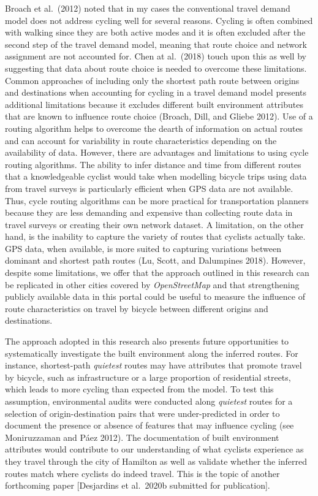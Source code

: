 \documentclass[smallextended]{svjour3}       %
\begin{document}
Broach et al.~(2012) noted that in my cases the conventional travel
demand model does not address cycling well for several reasons. Cycling
is often combined with walking since they are both active modes and it
is often excluded after the second step of the travel demand model,
meaning that route choice and network assignment are not accounted for.
Chen at al.~(2018) touch upon this as well by suggesting that data about
route choice is needed to overcome these limitations. Common approaches
of including only the shortest path route between origins and
destinations when accounting for cycling in a travel demand model
presents additional limitations because it excludes different built
environment attributes that are known to influence route choice (Broach,
Dill, and Gliebe 2012). Use of a routing algorithm helps to overcome the
dearth of information on actual routes and can account for variability
in route characteristics depending on the availability of data. However,
there are advantages and limitations to using cycle routing algorithms.
The ability to infer distance and time from different routes that a
knowledgeable cyclist would take when modelling bicycle trips using data
from travel surveys is particularly efficient when GPS data are not
available. Thus, cycle routing algorithms can be more practical for
transportation planners because they are less demanding and expensive
than collecting route data in travel surveys or creating their own
network dataset. A limitation, on the other hand, is the inability to
capture the variety of routes that cyclists actually take. GPS data,
when available, is more suited to capturing variations between dominant
and shortest path routes (Lu, Scott, and Dalumpines 2018). However,
despite some limitations, we offer that the approach outlined in this
research can be replicated in other cities covered by
\emph{OpenStreetMap} and that strengthening publicly available data in
this portal could be useful to measure the influence of route
characteristics on travel by bicycle between different origins and
destinations.

The approach adopted in this research also presents future opportunities
to systematically investigate the built environment along the inferred
routes. For instance, shortest-path \emph{quietest} routes may have
attributes that promote travel by bicycle, such as infrastructure or a
large proportion of residential streets, which leads to more cycling
than expected from the model. To test this assumption, environmental
audits were conducted along \emph{quietest} routes for a selection of
origin-destination pairs that were under-predicted in order to document
the presence or absence of features that may influence cycling (see
Moniruzzaman and Páez 2012). The documentation of built environment
attributes would contribute to our understanding of what cyclists
experience as they travel through the city of Hamilton as well as
validate whether the inferred routes match where cyclists do indeed
travel. This is the topic of another forthcoming paper {[}Desjardins et
al.~2020b submitted for publication{]}.
\end{document}
